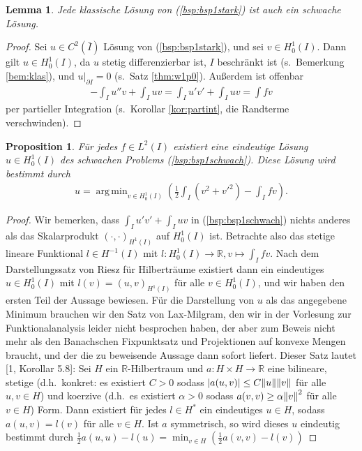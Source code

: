 \documentclass[twoside]{article}
\newtheorem{lemma}[theorem]{Lemma}
\newtheorem{proposition}[theorem]{Proposition}
\theoremstyle{definition}
\DeclareMathOperator*{\argmin}{arg\,min}
\begin{document}
\begin{lemma}
Jede klassische Lösung von (\ref{bsp:bsp1stark}) ist auch ein schwache Lösung.
\end{lemma}
\begin{proof}
Sei $u \in C^2(\bar{I})$ Lösung von (\ref{bsp:bsp1stark}), und sei $v \in H^1_0(I)$. Dann gilt $u \in H^1_0(I)$, da $u$ stetig differenzierbar ist, $I$ beschränkt ist (s.\ Bemerkung \ref{bem:klas}), und $u|_{\partial I}=0$ (s.\ Satz \ref{thm:w1p0}). Außerdem ist offenbar
\begin{align*}
-\int_I u'' v + \int_I uv = \int_I u' v' + \int_I uv = \int fv
\end{align*}
per partieller Integration (s.\ Korollar \ref{kor:partint}, die Randterme verschwinden).
\end{proof}
\begin{proposition} \label{prop:min}
Für jedes $f \in L^2(I)$ existiert eine eindeutige Lösung $u \in H_0^1(I)$ des schwachen Problems (\ref{bsp:bsp1schwach}). Diese Lösung wird bestimmt durch
\begin{align*}
u = \argmin_{v \in H_0^1(I)} \left(\frac{1}{2} \int_I (v^2+v'^2)-\int_I fv \right).
\end{align*}
\end{proposition}
\begin{proof}
Wir bemerken, dass $\int_I u'v' + \int_I uv$ in (\ref{bsp:bsp1schwach}) nichts anderes als das Skalarprodukt $(\cdot,\cdot)_{H^1(I)}$ auf $H^1_0(I)$ ist. Betrachte also das stetige lineare Funktional $l \in H^{-1}(I)$ mit $l:H^1_0(I) \to \mathbb{R}, v \mapsto \int_I fv$. Nach dem Darstellungssatz von Riesz für Hilberträume existiert dann ein eindeutiges $u \in H^1_0(I)$ mit $l(v) = (u,v)_{H^1(I)}$ für alle $v \in H^1_0(I)$, und wir haben den ersten Teil der Aussage bewiesen. Für die Darstellung von $u$ als das angegebene Minimum brauchen wir den Satz von Lax-Milgram, den wir in der Vorlesung zur Funktionalanalysis leider nicht besprochen haben, der aber zum Beweis nicht mehr als den Banachschen Fixpunktsatz und Projektionen auf konvexe Mengen braucht, und der die zu beweisende Aussage dann sofort liefert. Dieser Satz lautet [1, Korollar 5.8]: Sei $H$ ein $\mathbb{R}$-Hilbertraum und $a:H\times H \to \mathbb{R}$ eine bilineare, stetige (d.h.\ konkret: es existiert $C>0$ sodass $\abs{a(u,v)} \leq C \norm{u} \norm{v}$ für alle $u,v \in H$) und koerzive (d.h.\ es existiert $\alpha>0$ sodass $a(v,v)\geq \alpha \norm{v}^2$ für alle $v \in H$) Form. Dann existiert für jedes $l \in H^*$ ein eindeutiges $u \in H$, sodass $a(u,v)=l(v)$ für alle $v \in H$. Ist $a$ symmetrisch, so wird dieses $u$ eindeutig bestimmt durch $\frac{1}{2} a(u,u) - l(u) = \min_{v \in H}\left(\frac{1}{2} a(v,v) - l(v) \right)$
\end{proof}
\end{document}
